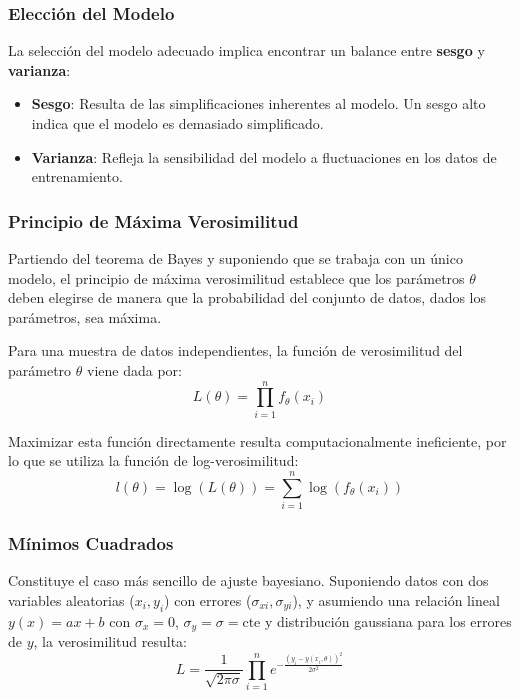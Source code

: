 \documentclass[twocolumn]{article}
\begin{document}
\subsubsection{Elección del Modelo}

La selección del modelo adecuado implica encontrar un balance entre \textbf{sesgo} y \textbf{varianza}:

\begin{itemize}
\item \textbf{Sesgo}: Resulta de las simplificaciones inherentes al modelo. Un sesgo alto indica que el modelo es demasiado simplificado.
\item \textbf{Varianza}: Refleja la sensibilidad del modelo a fluctuaciones en los datos de entrenamiento.
\end{itemize}

\subsubsection{Principio de Máxima Verosimilitud}

Partiendo del teorema de Bayes y suponiendo que se trabaja con un único modelo, el principio de máxima verosimilitud establece que los parámetros $\theta$ deben elegirse de manera que la probabilidad del conjunto de datos, dados los parámetros, sea máxima.

\medskip

Para una muestra de datos independientes, la función de verosimilitud del parámetro $\theta$ viene dada por:
\[
L\left( \theta  \right) = \prod_{i=1}^{n} f_{\theta}(x_i)
\]

Maximizar esta función directamente resulta computacionalmente ineficiente, por lo que se utiliza la función de log-verosimilitud:
\[
l\left( \theta  \right) = \log(L(\theta)) = \sum_{i=1}^{n} \log(f_{\theta}(x_i))
\]

\subsubsection{Mínimos Cuadrados}

Constituye el caso más sencillo de ajuste bayesiano. Suponiendo datos con dos variables aleatorias ($x_i,y_i$) con errores ($\sigma_{xi},\sigma_{yi}$), y asumiendo una relación lineal $y(x) = ax + b$ con $\sigma_x = 0$, $\sigma_y = \sigma = \text{cte}$ y distribución gaussiana para los errores de $y$, la verosimilitud resulta:
\begin{equation}
L = \frac{1}{\sqrt{2\pi\sigma}}\prod_{i=1}^n e^{-\frac{(y_i - y(x_i,\theta))^2}{2\sigma^2}}
\end{equation}
\end{document}
